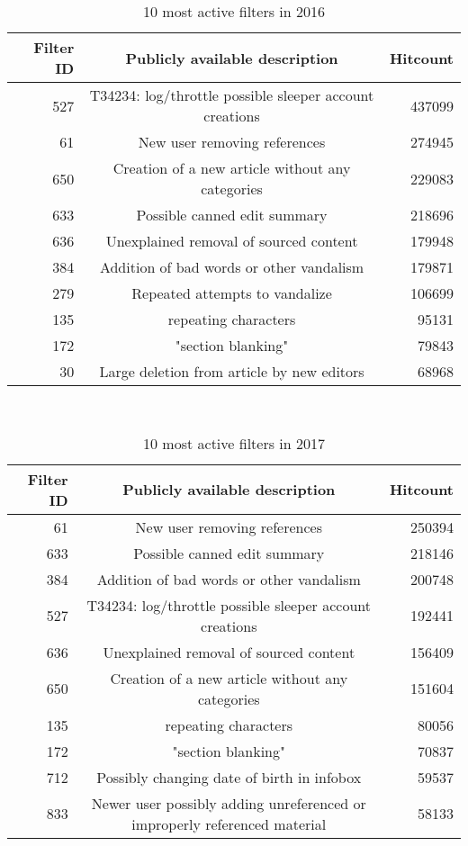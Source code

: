 \begin{table}
  \centering
  \begin{tabular}{r c r }
    Filter ID & Publicly available description & Hitcount \\
    \hline
    527 & T34234: log/throttle possible sleeper account creations & 437099 \\
    61 & New user removing references & 274945 \\
    650 & Creation of a new article without any categories & 229083 \\
    633 & Possible canned edit summary & 218696 \\
    636 & Unexplained removal of sourced content & 179948 \\
    384 & Addition of bad words or other vandalism & 179871 \\
    279 & Repeated attempts to vandalize & 106699 \\
    135 & repeating characters & 95131 \\
    172 & "section blanking" & 79843 \\
    30 & Large deletion from article by new editors & 68968 \\
  \end{tabular}
  \caption{10 most active filters in 2016}~\label{tab:most-active-2016}
\end{table}

\begin{table}
  \centering
  \begin{tabular}{r c r }
    Filter ID & Publicly available description & Hitcount \\
    \hline
    61 & New user removing references & 250394 \\
    633 & Possible canned edit summary & 218146 \\
    384 & Addition of bad words or other vandalism & 200748 \\
    527 & T34234: log/throttle possible sleeper account creations & 192441 \\
    636 & Unexplained removal of sourced content & 156409 \\
    650 & Creation of a new article without any categories & 151604 \\
    135 & repeating characters & 80056 \\
    172 & "section blanking" & 70837 \\
    712 & Possibly changing date of birth in infobox & 59537 \\
    833 & Newer user possibly adding unreferenced or improperly referenced material & 58133 \\
  \end{tabular}
  \caption{10 most active filters in 2017}~\label{tab:most-active-2017}
\end{table}

